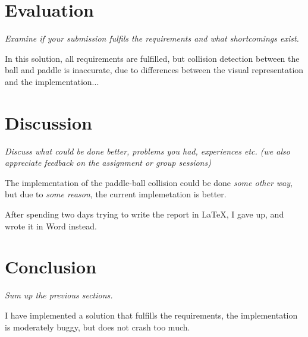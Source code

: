 \documentclass[11pt]{article}
\begin{document}
    \section{Evaluation}

    \emph{Examine if your submission fulfils the requirements and what shortcomings exist.}

    In this solution, all requirements are fulfilled, but collision detection between the ball and paddle is inaccurate, due to differences between the visual representation and the implementation...


    \section{Discussion}

    \emph{Discuss what could be done better, problems you had, experiences etc. (we also appreciate feedback on the assignment or group sessions) }

    The implementation of the paddle-ball collision could be done \emph{some other way}, but due to \emph{some reason}, the current implemetation is better.

    After spending two days trying to write the report in \LaTeX, I gave up, and wrote it in Word instead.


    \section{Conclusion}

    \emph{Sum up the previous sections.}

    I have implemented a solution that fulfills the requirements, the implementation is moderately buggy, but does not crash too much.


    
    
\end{document}
